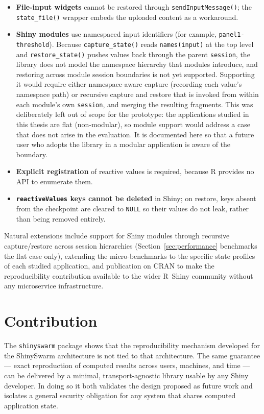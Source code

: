 \documentclass[11pt,a4paper]{article}
\begin{document}
\begin{itemize}
  \item \textbf{File-input widgets} cannot be restored through
    \texttt{sendInputMessage()}; the \texttt{state\_file()} wrapper embeds the
    uploaded content as a workaround.
  \item \textbf{Shiny modules} use namespaced input identifiers (for example,
    \texttt{panel1-threshold}). Because \texttt{capture\_state()} reads
    \texttt{names(input)} at the top level and \texttt{restore\_state()} pushes
    values back through the parent \texttt{session}, the library does not model
    the namespace hierarchy that modules introduce, and restoring across module
    session boundaries is not yet supported. Supporting it would require either
    namespace-aware capture (recording each value's namespace path) or recursive
    capture and restore that is invoked from within each module's own
    \texttt{session}, and merging the resulting fragments. This was deliberately
    left out of scope for the prototype: the applications studied in this thesis
    are flat (non-modular), so module support would address a case that does not
    arise in the evaluation. It is documented here so that a future user who
    adopts the library in a modular application is aware of the boundary.
  \item \textbf{Explicit registration} of reactive values is required, because R
    provides no API to enumerate them.
  \item \textbf{\texttt{reactiveValues} keys cannot be deleted} in Shiny; on
    restore, keys absent from the checkpoint are cleared to \texttt{NULL} so
    their values do not leak, rather than being removed entirely.
\end{itemize}

Natural extensions include support for Shiny modules through recursive
capture/restore across session hierarchies (Section~\ref{sec:performance}
benchmarks the flat case only), extending the micro-benchmarks to the specific
state profiles of each studied application, and publication on CRAN to make the
reproducibility contribution available to the wider R~Shiny community without any
microservice infrastructure.

\section{Contribution}

The \texttt{shinyswarm} package shows that the reproducibility mechanism
developed for the ShinySwarm architecture is not tied to that architecture. The
same guarantee --- exact reproduction of computed results across users,
machines, and time --- can be delivered by a minimal, transport-agnostic library
usable by any Shiny developer. In doing so it both validates the design proposed
as future work and isolates a general security obligation for any system that
shares computed application state.
\end{document}
